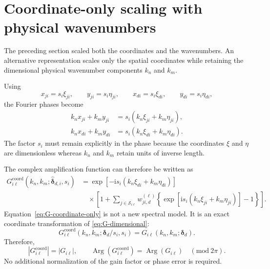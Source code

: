 \documentclass[11pt]{article}
\numberwithin{equation}{section}
\DeclareMathOperator{\Arg}{Arg}
\newcommand{\ii}{\mathrm{i}}
\begin{document}
\section{Coordinate-only scaling with physical wavenumbers}
\label{sec:coordinate-only-scaling}

The preceding section scaled both the coordinates and the wavenumbers. An alternative representation scales only the spatial coordinates while retaining the dimensional physical wavenumber components $k_n$ and $k_m$.

Using
\begin{equation}
    x_{ji}=s_i\xi_{ji},
    \qquad
    y_{ji}=s_i\eta_{ji},
    \qquad
    x_{di}=s_i\xi_{di},
    \qquad
    y_{di}=s_i\eta_{di},
    \label{eq:inverse-coordinate-scaling}
\end{equation}
the Fourier phases become
\begin{align}
    k_nx_{ji}+k_my_{ji}
    &=
    s_i\left(k_n\xi_{ji}+k_m\eta_{ji}\right),
    \label{eq:coordinate-only-node-phase}\\
    k_nx_{di}+k_my_{di}
    &=
    s_i\left(k_n\xi_{di}+k_m\eta_{di}\right).
    \label{eq:coordinate-only-departure-phase}
\end{align}
The factor $s_i$ must remain explicitly in the phase because the coordinates $\xi$ and $\eta$ are dimensionless whereas $k_n$ and $k_m$ retain units of inverse length.

The complex amplification function can therefore be written as
\begin{equation}
\boxed{
\begin{aligned}
    G_{i\ell}^{\mathrm{coord}}
    \!\left(
        k_n,k_m;
        \widehat{\bm{\delta}}_{d,i},s_i
    \right)
    &=
    \exp\!\left[-\ii s_i\left(
        k_n\xi_{di}+k_m\eta_{di}
    \right)\right]
    \\
    &\quad\times
    \left[
        1+
        \sum_{j\in\mathcal S_{i\ell}}
        w_{ji,d}^{(\ell)}
        \left\{
            \exp\!\left[\ii s_i\left(
                k_n\xi_{ji}+k_m\eta_{ji}
            \right)\right]-1
        \right\}
    \right].
\end{aligned}
}
\label{eq:G-coordinate-only}
\end{equation}
Equation~\eqref{eq:G-coordinate-only} is not a new spectral model. It is an exact coordinate transformation of \cref{eq:G-dimensional}:
\begin{equation}
    \boxed{
    G_{i\ell}^{\mathrm{coord}}
    \!\left(
        k_n,k_m;
        \bm{\delta}_d/s_i,s_i
    \right)
    =
    G_{i\ell}\!\left(k_n,k_m;\bm{\delta}_d\right).
    }
    \label{eq:coordinate-only-equivalence}
\end{equation}
Therefore,
\begin{equation}
    \left|G_{i\ell}^{\mathrm{coord}}\right|
    =
    \left|G_{i\ell}\right|,
    \qquad
    \Arg\!\left(G_{i\ell}^{\mathrm{coord}}\right)
    =
    \Arg\!\left(G_{i\ell}\right)
    \quad (\mathrm{mod}\ 2\pi).
    \label{eq:coordinate-only-gain-phase-equivalence}
\end{equation}
No additional normalization of the gain factor or phase error is required.
\end{document}
